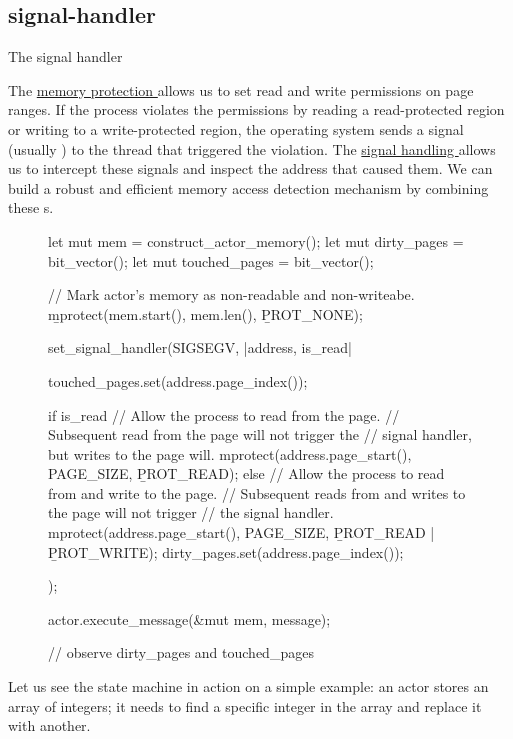 \documentclass{article}
\begin{document}
\subsection{signal-handler}{The signal handler}

The \href{https://man7.org/linux/man-pages/man2/mprotect.2.html}{memory protection } allows us to set read and write permissions on page ranges.
If the process violates the permissions by reading a read-protected region or writing to a write-protected region, the operating system sends a signal (usually ) to the thread that triggered the violation.
The \href{https://man7.org/linux/man-pages/man7/signal.7.html}{signal handling } allows us to intercept these signals and inspect the address that caused them.
We can build a robust and efficient memory access detection mechanism by combining these s.

\begin{figure}
\begin{code}[rust]
let mut mem = construct_actor_memory();
let mut dirty_pages = bit_vector();
let mut touched_pages = bit_vector();

// Mark actor's memory as non-readable and non-writeabe.
\b{mprotect}(mem.start(), mem.len(), \b{PROT_NONE});

set_signal_handler(SIGSEGV, |address, is_read| {
  touched_pages.set(address.page_index());

  if is_read {
    // Allow the process to read from the page.
    // Subsequent read from the page will not trigger the
    // signal handler, but writes to the page will.
    mprotect(address.page_start(), PAGE_SIZE, \b{PROT_READ});
  } else {
    // Allow the process to read from and write to the page.
    // Subsequent reads from and writes to the page will not trigger
    // the signal handler.
    mprotect(address.page_start(), PAGE_SIZE, \b{PROT_READ} | \b{PROT_WRITE});
    dirty_pages.set(address.page_index());
  }
});

actor.execute_message(&mut mem, message);

// observe dirty_pages and touched_pages
\end{code}
\end{figure}

Let us see the state machine in action on a simple example:
an actor stores an array of integers; it needs to find a specific integer in the array and replace it with another.
\end{document}
